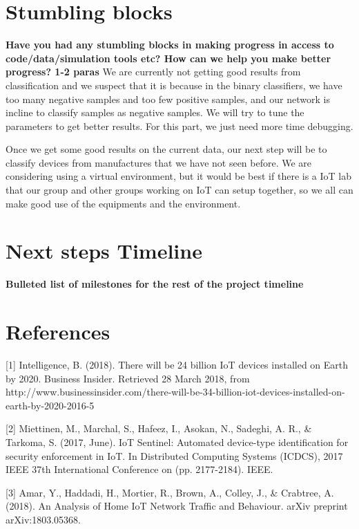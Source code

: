 \documentclass[twocolumn,10pt]{article}
\begin{document}
\section{Stumbling blocks}

{\bf Have you had any stumbling blocks in making progress in access to code/data/simulation tools etc? How can we help you make better progress? 1-2 paras}
We are currently not getting good results from classification and we suspect that it is because in the binary classifiers, we have too many negative samples and too few positive samples, and our network is incline to classify samples as negative samples. We will try to tune the parameters to get better results. For this part, we just need more time debugging.

Once we get some good results on the current data, our next step will be to classify devices from manufactures that we have not seen before. We are considering using a virtual environment, but it would be best if there is a IoT lab that our group and other groups working on IoT can setup together, so we all can make good use of the equipments and the environment.

\section{Next steps  Timeline}

{\bf Bulleted list of milestones for the rest of the project timeline}

\section{References}

[1] Intelligence, B. (2018). There will be 24 billion IoT devices installed on Earth by 2020. Business Insider. Retrieved 28 March 2018, from http://www.businessinsider.com/there-will-be-34-billion-iot-devices-installed-on-earth-by-2020-2016-5

[2] Miettinen, M., Marchal, S., Hafeez, I., Asokan, N., Sadeghi, A. R., \& Tarkoma, S. (2017, June). IoT Sentinel: Automated device-type identification for security enforcement in IoT. In Distributed Computing Systems (ICDCS), 2017 IEEE 37th International Conference on (pp. 2177-2184). IEEE.

[3] Amar, Y., Haddadi, H., Mortier, R., Brown, A., Colley, J., \& Crabtree, A. (2018). An Analysis of Home IoT Network Traffic and Behaviour. arXiv preprint arXiv:1803.05368.

{
\footnotesize
\raggedright


}

%
\end{document}
